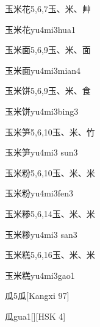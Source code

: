 \begin{Entry}{玉米花}{5,6,7}{⽟、⽶、⾋}
  \begin{Phonetics}{玉米花}{yu4mi3hua1}
  \end{Phonetics}
\end{Entry}

\begin{Entry}{玉米面}{5,6,9}{⽟、⽶、⾯}
  \begin{Phonetics}{玉米面}{yu4mi3mian4}
  \end{Phonetics}
\end{Entry}

\begin{Entry}{玉米饼}{5,6,9}{⽟、⽶、⾷}
  \begin{Phonetics}{玉米饼}{yu4mi3bing3}
  \end{Phonetics}
\end{Entry}

\begin{Entry}{玉米笋}{5,6,10}{⽟、⽶、⽵}
  \begin{Phonetics}{玉米笋}{yu4mi3 sun3}
  \end{Phonetics}
\end{Entry}

\begin{Entry}{玉米粉}{5,6,10}{⽟、⽶、⽶}
  \begin{Phonetics}{玉米粉}{yu4mi3fen3}
  \end{Phonetics}
\end{Entry}

\begin{Entry}{玉米糁}{5,6,14}{⽟、⽶、⽶}
  \begin{Phonetics}{玉米糁}{yu4mi3 san3}
  \end{Phonetics}
\end{Entry}

\begin{Entry}{玉米糕}{5,6,16}{⽟、⽶、⽶}
  \begin{Phonetics}{玉米糕}{yu4mi3gao1}
  \end{Phonetics}
\end{Entry}

\begin{Entry}{瓜}{5}{⽠}[Kangxi 97]
  \begin{Phonetics}{瓜}{gua1}[][HSK 4]
  \end{Phonetics}
\end{Entry}

